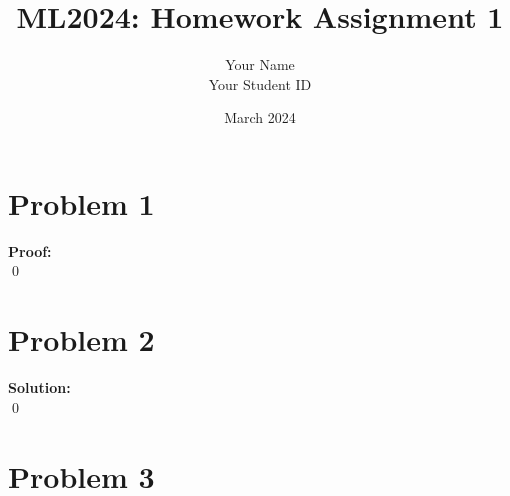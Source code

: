 \documentclass[12pt, a4paper,oneside, UTF8]{article}
\title{ML2024: Homework Assignment 1}
\author{
Your Name\\
Your Student ID
}
\date{March 2024}
\renewenvironment{proof}{\textbf{Proof:}\\}{\qed\par}
\newenvironment{solution}{\textbf{Solution:}\\}{\qed\par}
\begin{document}
\maketitle

\section{Problem 1}
\begin{proof}
    
\end{proof}



\section{Problem 2}
\begin{solution}
    
\end{solution}



\section{Problem 3}
\end{document}
